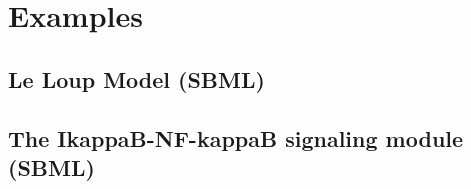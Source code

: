 \chapter{Examples}

%
%


\section{Le Loup Model (SBML)}



\newpage
\section{The IkappaB-NF-kappaB signaling module (SBML)}
